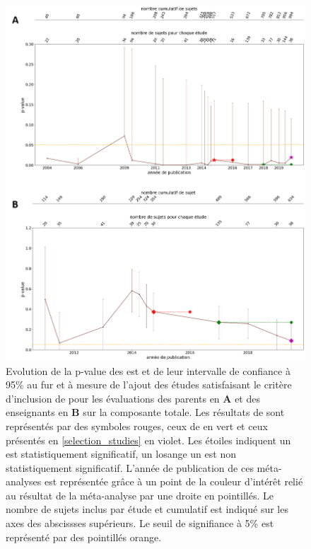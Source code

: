 \begin{itemize}
\begin{figure}[h!]
  \centering
	\includegraphics[width=1\linewidth]{figures/chapter-2/meta-analysis-evolution-pvalue-total} 
  \caption{Evolution de la p-value des \gls{est} et de leur intervalle de confiance à 95\% au fur et à mesure de l'ajout des études satisfaisant le critère d'inclusion de \citet{Cortese2016} pour les évaluations des 
	parents en \textbf{A} et des enseignants en \textbf{B} sur la composante totale.
  Les résultats de \citep{Cortese2016} sont représentés par des symboles rouges, ceux de \citet{Bussalb2016clinical} en vert et ceux présentés en \ref{selection_studies} en violet. Les étoiles 
	indiquent un \gls{est} statistiquement significatif, un losange un \gls{est} non statistiquement significatif. L'année de publication de ces méta-analyses est représentée grâce à un point de la couleur 
	d'intérêt relié au résultat de la méta-analyse par une droite en pointillés.
	Le nombre de sujets inclus par étude et cumulatif est indiqué sur les axes des abscissses supérieurs.
	Le seuil de signifiance à 5\% est représenté par des pointillés orange.}
  \label{Figure:meta_analysis_evolution_pvalue_total}
\end{figure}


\end{itemize}
